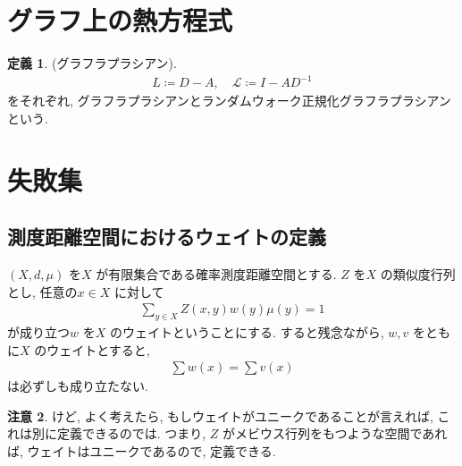\documentclass[10pt, fleqn, label-section=none]{bxjsarticle}
\theoremstyle{definition}
\newtheorem{dfn}{定義}[section]
\newtheorem{remark}[dfn]{注意}
\renewcommand{\;}{\, ; \,}
\begin{document}
\section{グラフ上の熱方程式}

\begin{dfn}(グラフラプラシアン).
\begin{align*} L \coloneqq D - A, \quad \mathcal L \coloneqq I - A D^{-1}\end{align*}
をそれぞれ, グラフラプラシアンとランダムウォーク正規化グラフラプラシアンという. 
\end{dfn}

















\section{失敗集}

\subsection{測度距離空間におけるウェイトの定義}

$(X, d, \mu)$ を$X$ が有限集合である確率測度距離空間とする. $Z$ を$X$ の類似度行列とし, 任意の$x \in X$ に対して
\begin{align*} \sum_{y \in X} Z(x, y)w(y)\mu(y) = 1 \end{align*}
が成り立つ$w$ を$X$ のウェイトということにする. すると残念ながら, 
$w, v$ をともに$X$ のウェイトとすると, 
\begin{align*} \sum w(x) = \sum v(x) \end{align*}
は必ずしも成り立たない. 

\begin{remark}
けど, よく考えたら, もしウェイトがユニークであることが言えれば, これは別に定義できるのでは. つまり, $Z$ がメビウス行列をもつような空間であれば, ウェイトはユニークであるので, 定義できる. 
\end{remark}
\end{document}
